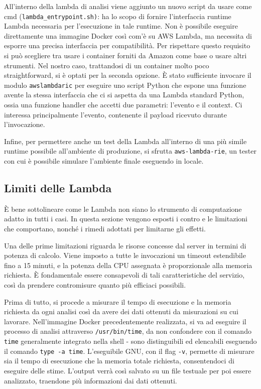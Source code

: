 All'interno della lambda di analisi viene aggiunto un nuovo script da usare come cmd (\texttt{lambda\_entrypoint.sh)}: ha lo scopo di fornire l'interfaccia runtime Lambda necessaria per l'esecuzione in tale runtime.
Non è possibile eseguire direttamente una immagine Docker così com'è su AWS Lambda, ma necessita di esporre una precisa interfaccia per compatibilità. Per rispettare questo requisito si può scegliere tra usare i container forniti da Amazon come base o usare altri strumenti. Nel nostro caso, trattandosi di un container molto poco straightforward, si è optati per la seconda opzione. È stato sufficiente invocare il modulo \texttt{awslambdaric} per eseguire uno script Python che espone una funzione avente la stessa interfaccia che ci si aspetta da una Lambda standard Python, ossia una funzione handler che accetti due parametri: l'evento e il context. Ci interessa principalmente l'evento, contenente il payload ricevuto durante l'invocazione.

Infine, per permettere anche un test della Lambda all'interno di una più simile runtime possibile all'ambiente di produzione, si sfrutta \texttt{aws-lambda-rie}, un tester con cui è possibile simulare l'ambiente finale eseguendo in locale.

\subsection{Limiti delle Lambda}
È bene sottolineare come le Lambda non siano lo strumento di computazione adatto in tutti i casi. In questa sezione vengono esposti i contro e le limitazioni che comportano, nonché i rimedi adottati per limitarne gli effetti.

Una delle prime limitazioni riguarda le risorse concesse dal server in termini di potenza di calcolo. Viene imposto a tutte le invocazioni un timeout estendibile fino a 15 minuti, e la potenza della CPU assegnata è proporzionale alla memoria richiesta.
È fondamentale essere consapevoli di tali caratteristiche del servizio, così da prendere contromisure quanto più efficiaci possibili.

Prima di tutto, si procede a misurare il tempo di esecuzione e la memoria richiesta da ogni analisi così da avere dei dati ottenuti da misurazioni su cui lavorare. Nell'immagine Docker precedentemente realizzata, si va ad eseguire il processo di analisi attraverso \texttt{/usr/bin/time}, da non confondere con il comando \texttt{time} generalmente integrato nella shell - sono distinguibili ed elencabili eseguendo il comando \texttt{type -a time}. L'eseguibile GNU, con il flag \texttt{-v}, permette di misurare sia il tempo di esecuzione che la memoria totale richiesta, consentendoci di eseguire delle stime. L'output verrà così salvato su un file testuale per poi essere analizzato, traendone più informazioni dai dati ottenuti.

